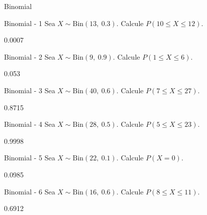 \documentclass[a4,11pt]{aleph-notas}
\newcommand{\Bin}{\text{Bin}}
\begin{document}
\begin{quiz}{Binomial}

\begin{numerical}[tolerance=0.001]%
    {Binomial - 1}
    Sea \( X \sim \Bin(13,\ 0.3) \). Calcule \( P(10 \leq X \leq 12) \).
    \item[] 0.0007
\end{numerical}

\begin{numerical}[tolerance=0.001]%
    {Binomial - 2}
    Sea \( X \sim \Bin(9,\ 0.9) \). Calcule \( P(1 \leq X \leq 6) \).
    \item[] 0.053
\end{numerical}

\begin{numerical}[tolerance=0.001]%
    {Binomial - 3}
    Sea \( X \sim \Bin(40,\ 0.6) \). Calcule \( P(7 \leq X \leq 27) \).
    \item[] 0.8715
\end{numerical}

\begin{numerical}[tolerance=0.001]%
    {Binomial - 4}
    Sea \( X \sim \Bin(28,\ 0.5) \). Calcule \( P(5 \leq X \leq 23) \).
    \item[] 0.9998
\end{numerical}

\begin{numerical}[tolerance=0.001]%
    {Binomial - 5}
    Sea \( X \sim \Bin(22,\ 0.1) \). Calcule \( P(X = 0) \).
    \item[] 0.0985
\end{numerical}

\begin{numerical}[tolerance=0.001]%
    {Binomial - 6}
    Sea \( X \sim \Bin(16,\ 0.6) \). Calcule \( P(8 \leq X \leq 11) \).
    \item[] 0.6912
\end{numerical}


\end{quiz}
\end{document}
